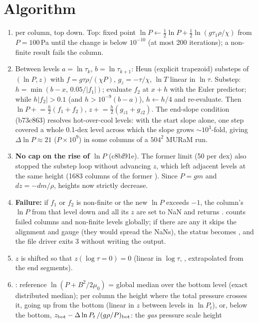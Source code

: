 \section{Algorithm}
\begin{enumerate}
\item {} per column, top down. Top: fixed point $\ln P\leftarrow\frac12\ln P+\frac12\ln(g\tau_1\rho/\chi)$
from $P=100$\,Pa until the change is below $10^{-10}$ (at most 200 iterations); a non-finite result fails the column.
\item Between levels $a=\ln\tau_k$, $b=\ln\tau_{k+1}$: Heun (explicit trapezoid) substeps of $(\ln P,z)$ with
$f=g\tau\rho/(\chi P)$, $g_z=-\tau/\chi$, $\ln T$ linear in $\ln\tau$. Substep: $h=\min(b-x,\,0.05/|f_1|)$; evaluate $f_2$ at
$x+h$ with the Euler predictor; while $h|f_2|>0.1$ (and $h>10^{-9}(b-a)$), $h\leftarrow h/4$ and re-evaluate. Then
$\ln P\mathrel{+}=\frac h2(f_1+f_2)$, $z\mathrel{+}=\frac h2(g_{z1}+g_{z2})$. The end-slope condition (b73c863) resolves
hot-over-cool levels: with the start slope alone, one step covered a whole 0.1-dex level across which the slope grows
${\sim}10^3$-fold, giving $\Delta\ln P\approx21$ ($P\times10^9$) in some columns of a $504^2$ MURaM run.
\item \textbf{No cap on the rise of $\ln P$} (c8bf91e). The former  limit (50 per dex) also stopped the
substep loop without advancing $z$, which left adjacent levels at the same height (1683 columns of
the former ). Since $P=gm$ and $dz=-dm/\rho$, heights now strictly decrease.
\item \textbf{Failure:} if $f_1$ or $f_2$ is non-finite or the new $\ln P$ exceeds $-1$, the column's $\ln P$
from that level down and all its $z$ are set to NaN and  returns .  counts
failed columns and non-finite levels globally; if there are any it skips the alignment and gauge (they would spread the
NaNs), the status becomes , and the file driver exits 3 without writing the output.
\item $z$ is shifted so that $z(\log\tau=0)=0$ (linear in $\log\tau$, , extrapolated from the end
segments).
\item {}: reference $\ln(P+B^2/2\mu_0)$ = global median over the bottom level (exact distributed median);
per column the height where the total pressure crosses it, going up from the bottom (linear in $z$ between levels in
$\ln P_t$), or, below the bottom, $z_{\rm bot}-\Delta\ln P_t\,/(g\rho/P)_{\rm bot}$: the \emph{gas} pressure scale height

\end{enumerate}
